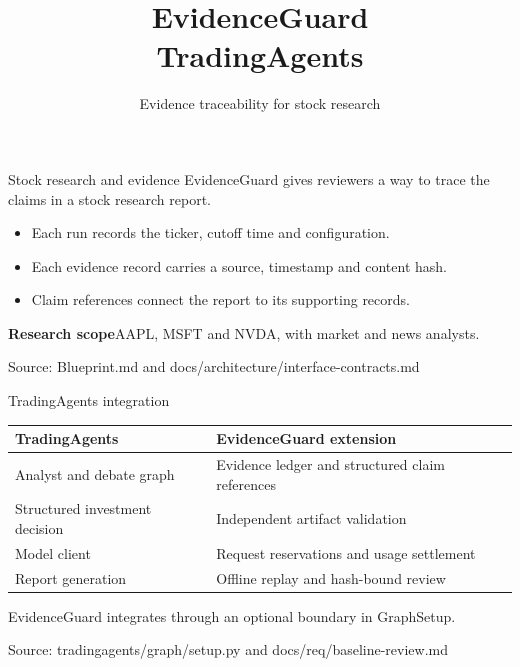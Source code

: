 \documentclass[aspectratio=169,11pt,t]{beamer}
\title[EvidenceGuard]{EvidenceGuard\\TradingAgents}
\subtitle{Evidence traceability for stock research}
\institute{CS5351 Software Engineering, City University of Hong Kong}
\date{}
\newcommand{\source}[1]{\par\vfill{\fontsize{6.6}{8}\selectfont\color{CityUMuted}Source: #1\par}}
\newcommand{\code}[1]{{\ttfamily\small #1}}
\begin{document}
\cityutitlepage

\begin{frame}{Stock research and evidence}
 EvidenceGuard gives reviewers a way to trace the claims in a stock research report.
 \medskip
 \begin{itemize}\setlength\itemsep{8pt}
  \item Each run records the ticker, cutoff time and configuration.
  \item Each evidence record carries a source, timestamp and content hash.
  \item Claim references connect the report to its supporting records.
 \end{itemize}
 \medskip\textbf{Research scope}\quad AAPL, MSFT and NVDA, with market and news analysts.
 \source{Blueprint.md and docs/architecture/interface-contracts.md}
\end{frame}

\begin{frame}{TradingAgents integration}
 \small
 \begin{tabularx}{\textwidth}{@{}L{.42\textwidth}Y@{}}
 \toprule TradingAgents & EvidenceGuard extension\\\midrule
 Analyst and debate graph & Evidence ledger and structured claim references\\[6pt]
 Structured investment decision & Independent artifact validation\\[6pt]
 Model client & Request reservations and usage settlement\\[6pt]
 Report generation & Offline replay and hash-bound review\\\bottomrule
 \end{tabularx}
 \par\medskip\normalsize
 EvidenceGuard integrates through an optional boundary in \code{GraphSetup}.
 \source{tradingagents/graph/setup.py and docs/req/baseline-review.md}
\end{frame}
\end{document}
